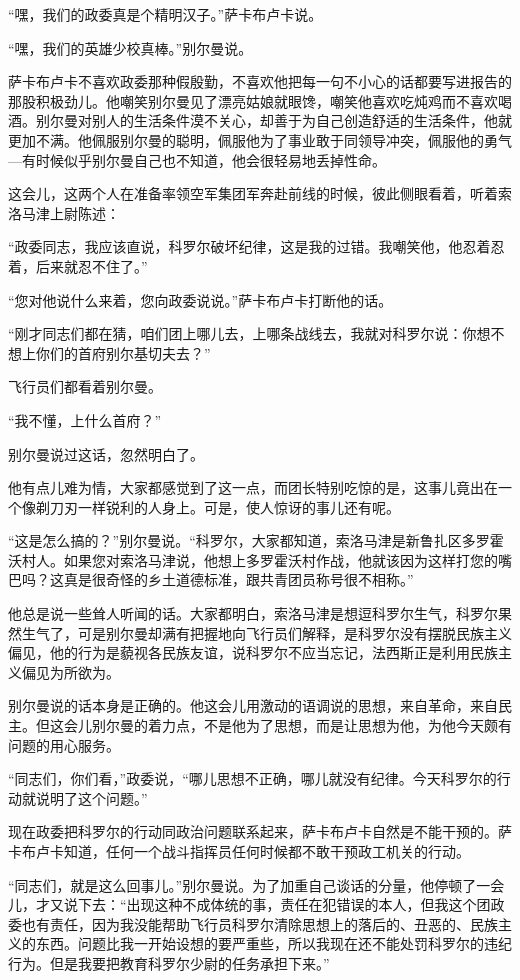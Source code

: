 “嘿，我们的政委真是个精明汉子。”萨卡布卢卡说。

“嘿，我们的英雄少校真棒。”别尔曼说。

萨卡布卢卡不喜欢政委那种假殷勤，不喜欢他把每一句不小心的话都要写进报告的那股积极劲儿。他嘲笑别尔曼见了漂亮姑娘就眼馋，嘲笑他喜欢吃炖鸡而不喜欢喝酒。别尔曼对别人的生活条件漠不关心，却善于为自己创造舒适的生活条件，他就更加不满。他佩服别尔曼的聪明，佩服他为了事业敢于同领导冲突，佩服他的勇气—有时候似乎别尔曼自己也不知道，他会很轻易地丢掉性命。

这会儿，这两个人在准备率领空军集团军奔赴前线的时候，彼此侧眼看着，听着索洛马津上尉陈述：

“政委同志，我应该直说，科罗尔破坏纪律，这是我的过错。我嘲笑他，他忍着忍着，后来就忍不住了。”

“您对他说什么来着，您向政委说说。”萨卡布卢卡打断他的话。

“刚才同志们都在猜，咱们团上哪儿去，上哪条战线去，我就对科罗尔说：你想不想上你们的首府别尔基切夫去？”

飞行员们都看着别尔曼。

“我不懂，上什么首府？”

别尔曼说过这话，忽然明白了。

他有点儿难为情，大家都感觉到了这一点，而团长特别吃惊的是，这事儿竟出在一个像剃刀刃一样锐利的人身上。可是，使人惊讶的事儿还有呢。

“这是怎么搞的？”别尔曼说。“科罗尔，大家都知道，索洛马津是新鲁扎区多罗霍沃村人。如果您对索洛马津说，他想上多罗霍沃村作战，他就该因为这样打您的嘴巴吗？这真是很奇怪的乡土道德标准，跟共青团员称号很不相称。”

他总是说一些耸人听闻的话。大家都明白，索洛马津是想逗科罗尔生气，科罗尔果然生气了，可是别尔曼却满有把握地向飞行员们解释，是科罗尔没有摆脱民族主义偏见，他的行为是藐视各民族友谊，说科罗尔不应当忘记，法西斯正是利用民族主义偏见为所欲为。

别尔曼说的话本身是正确的。他这会儿用激动的语调说的思想，来自革命，来自民主。但这会儿别尔曼的着力点，不是他为了思想，而是让思想为他，为他今天颇有问题的用心服务。

“同志们，你们看，”政委说，“哪儿思想不正确，哪儿就没有纪律。今天科罗尔的行动就说明了这个问题。”

现在政委把科罗尔的行动同政治问题联系起来，萨卡布卢卡自然是不能干预的。萨卡布卢卡知道，任何一个战斗指挥员任何时候都不敢干预政工机关的行动。

“同志们，就是这么回事儿。”别尔曼说。为了加重自己谈话的分量，他停顿了一会儿，才又说下去：“出现这种不成体统的事，责任在犯错误的本人，但我这个团政委也有责任，因为我没能帮助飞行员科罗尔清除思想上的落后的、丑恶的、民族主义的东西。问题比我一开始设想的要严重些，所以我现在还不能处罚科罗尔的违纪行为。但是我要把教育科罗尔少尉的任务承担下来。”

